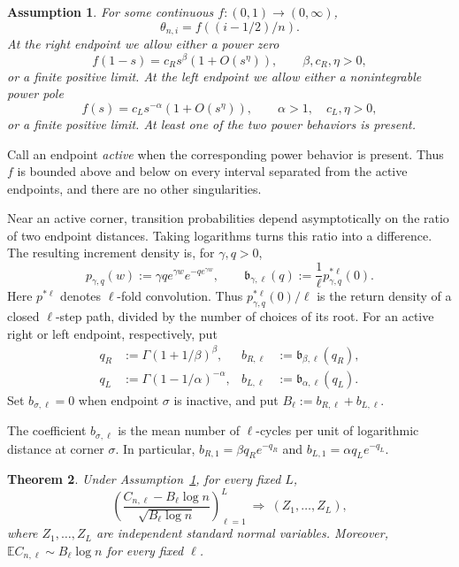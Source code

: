 \documentclass[11pt]{article}
\newtheorem{theorem}{Theorem}[section]
\theoremstyle{remark}
\theoremstyle{plain}
\newtheorem{assumption}[theorem]{Assumption}
\newcommand{\E}{\mathbb E}
\begin{document}
\begin{assumption}\label{ass:simple-power-profile}
For some continuous $f:(0,1)\to(0,\infty)$,
\[
 \theta_{n,i}=f((i-1/2)/n).
\]
At the right endpoint we allow either a power zero
\[
 f(1-s)=c_Rs^\beta(1+O(s^\eta)),
 \qquad \beta,c_R,\eta>0,
\]
or a finite positive limit.  At the left endpoint we allow either a
nonintegrable power pole
\[
 f(s)=c_Ls^{-\alpha}(1+O(s^\eta)),
 \qquad \alpha>1,\quad c_L,\eta>0,
\]
or a finite positive limit.  At least one of the two power behaviors is
present.
\end{assumption}

Call an endpoint \emph{active} when the corresponding power behavior is
present.  Thus $f$ is bounded above and below on every interval separated
from the active endpoints, and there are no other singularities.

Near an active corner, transition probabilities depend asymptotically on the
ratio of two endpoint distances.  Taking logarithms turns this ratio into a
difference.  The resulting increment density is, for $\gamma,q>0$,
\begin{equation}\label{eq:generic-power-kernel}
 p_{\gamma,q}(w):=\gamma q e^{\gamma w}e^{-qe^{\gamma w}},
 \qquad
 \mathfrak b_{\gamma,\ell}(q):=\frac1\ell p_{\gamma,q}^{*\ell}(0).
\end{equation}
Here $p^{*\ell}$ denotes $\ell$-fold convolution.  Thus
$p_{\gamma,q}^{*\ell}(0)/\ell$ is the return density of a closed $\ell$-step
path, divided by the number of choices of its root.
For an active right or left endpoint, respectively, put
\begin{align}
 q_R&:=\Gamma(1+1/\beta)^\beta,
 &b_{R,\ell}&:=\mathfrak b_{\beta,\ell}(q_R),\label{eq:simple-q-right}\\
 q_L&:=\Gamma(1-1/\alpha)^{-\alpha},
 &b_{L,\ell}&:=\mathfrak b_{\alpha,\ell}(q_L).\label{eq:simple-q-left}
\end{align}
Set $b_{\sigma,\ell}=0$ when endpoint $\sigma$ is inactive, and put
$B_\ell:=b_{R,\ell}+b_{L,\ell}$.

The coefficient $b_{\sigma,\ell}$ is the mean number of $\ell$-cycles per
unit of logarithmic distance at corner $\sigma$.  In particular,
$b_{R,1}=\beta q_Re^{-q_R}$ and $b_{L,1}=\alpha q_Le^{-q_L}$.

\begin{theorem}
\label{thm:power-clt}
Under Assumption~\ref{ass:simple-power-profile}, for every fixed $L$,
\begin{equation}\label{eq:power-clt}
 \left(
 \frac{C_{n,\ell}-B_\ell\log n}
 {\sqrt{B_\ell\log n}}
 \right)_{\ell=1}^L
 \ \Longrightarrow\ (Z_1,\ldots,Z_L),
\end{equation}
where $Z_1,\ldots,Z_L$ are independent standard normal variables.  Moreover,
$\E C_{n,\ell}\sim B_\ell\log n$ for every fixed $\ell$.
\end{theorem}
\end{document}
